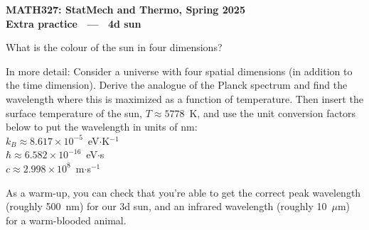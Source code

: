\documentclass[12 pt]{article} %
\begin{document}
\newcommand{\thisunit}{MATH327 Extra (4d sun)}
\newcommand{\moddate}{Last modified 26 Apr.~2025}
\begin{center}
  {\Large \textbf{MATH327: StatMech and Thermo, Spring 2025}} \\[12 pt]
  {\Large \textbf{Extra practice \ --- \ 4d sun}} \\[24 pt]
\end{center}

What is the colour of the sun in four dimensions?

In more detail: Consider a universe with four spatial dimensions (in addition to the time dimension).
Derive the analogue of the Planck spectrum and find the wavelength where this is maximized as a function of temperature.
Then insert the surface temperature of the sun, $T \approx 5778$~K, and use the unit conversion factors below to put the wavelength in units of nm: \\[-24 pt]

$k_B \approx 8.617\times 10^{-5}$~eV$\cdot$K$^{-1}$ \\[-24 pt]

$\hbar \approx 6.582\times 10^{-16}$~eV$\cdot$s \\[-24 pt]

$c \approx 2.998\times 10^8$~m$\cdot$s$^{-1}$

As a warm-up, you can check that you're able to get the correct peak wavelength (roughly 500~nm) for our 3d sun, and an infrared wavelength (roughly 10~$\mu$m) for a warm-blooded animal.
\end{document}
